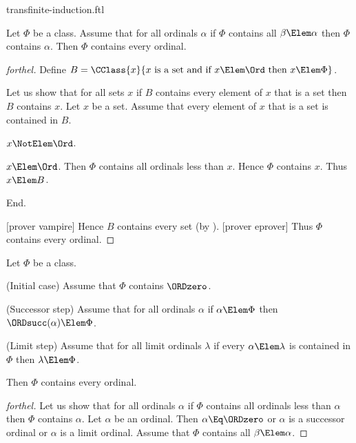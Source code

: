 \documentclass{stex}
\begin{document}
\begin{smodule}{transfinite-induction.ftl}

\begin{theorem}[forthel,id=SET_THEORY_02_8493935460614144]
  Let $\Phi$ be a class.
  Assume that for all ordinals $\alpha$ if $\Phi$ contains all $\beta \Elem \alpha$ then $\Phi$ contains $\alpha$.
  Then $\Phi$ contains every ordinal.
\end{theorem}
\begin{proof}[forthel]
  Define $B = \CClass{x}{x\text{ is a set and if }x \Elem \Ord\text{ then }x \Elem \Phi}$.

  Let us show that for all sets $x$ if $B$ contains every element of $x$ that is a set then $B$ contains $x$.
    Let $x$ be a set.
    Assume that every element of $x$ that is a set is contained in $B$.

    \begin{case}{$x \NotElem \Ord$.} \end{case}

    \begin{case}{$x \Elem \Ord$.}
      Then $\Phi$ contains all ordinals less than $x$.
      Hence $\Phi$ contains $x$.
      Thus $x \Elem B$.
    \end{case}
  End.

  [prover vampire]
  Hence $B$ contains every set (by ).
  [prover eprover]
  Thus $\Phi$ contains every ordinal.
\end{proof}

\begin{theorem}[forthel,id=SET_THEORY_02_7892040431960064]
  Let $\Phi$ be a class.
  
  (Initial case) Assume that $\Phi$ contains $\ORDzero$.
  
  (Successor step) Assume that for all ordinals $\alpha$ if $\alpha \Elem \Phi$ then $\ORDsucc(\alpha) \Elem \Phi$.
  
  (Limit step) Assume that for all limit ordinals $\lambda$ if every $\alpha \Elem \lambda$ is contained in $\Phi$ then $\lambda \Elem \Phi$.
  
  Then $\Phi$ contains every ordinal.
\end{theorem}
\begin{proof}[forthel]
  Let us show that for all ordinals $\alpha$ if $\Phi$ contains all ordinals
  less than $\alpha$ then $\Phi$ contains $\alpha$.
    Let $\alpha$ be an ordinal.
    Then $\alpha \Eq \ORDzero$ or $\alpha$ is a successor ordinal or $\alpha$ is a
    limit ordinal.
    Assume that $\Phi$ contains all $\beta \Elem \alpha$.


\end{proof}
\end{smodule}
\end{document}
